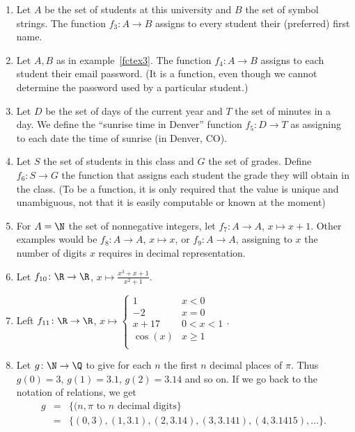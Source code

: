 \begin{enumerate}
\item Let $A$ be the set of students at this university and $B$ the set of
symbol strings. The function $f_3\colon A\to B$ assigns to every student their
(preferred) first name. \label{fctex3}
\item Let $A,B$ as in example~\ref{fctex3}.
The function $f_4\colon A\to B$ assigns to each student
their email password. (It is a function, even though we cannot determine the
password used by a particular student.)
\item Let $D$ be the set of days of the current year and $T$ the set of
minutes in a day. We define the ``sunrise time in Denver'' function $f_5\colon
D\to T$ as assigning to each date the time of sunrise (in Denver, CO).
\item Let $S$ the set of students in this class and $G$ the set of grades.
Define $f_6\colon S\to G$ the function that assigns each student the
grade they will obtain in the class.
(To be a function, it is only required that the value is unique and
unambiguous, not that it is easily computable or known at the moment)
\item For $A=\N$ the set of nonnegative integers,
let $f_7\colon A\to A$, $x\mapsto x+1$. Other examples would be
$f_8\colon A\to A$, $x\mapsto x$, or
$f_9\colon A\to A$, assigning to $x$ the number of digits $x$ requires in
decimal representation.
\item Let $f_{10}\colon \R\to\R$, $x\mapsto\frac{x^3+x+1}{x^2+1}$.
\item Left $f_{11}\colon\R\to\R$, $x\mapsto\begin{cases}
1&x<0\\
-2&x=0\\
x+17&0<x<1\\
\cos(x)&x\ge 1\\
\end{cases}$.
\item Let $g\colon\N\to\Q$ to give for each $n$ the first $n$ decimal
places of $\pi$. Thus $g(0)=3$, $g(1)=3.1$, $g(2)=3.14$ and so on. If we go
back to the notation of relations, we get
\begin{eqnarray*}
g&=&\{(n,\mbox{$\pi$ to $n$ decimal digits}\}\\
&=&\{(0,3),(1,3.1),(2,3.14),(3,3.141),(4,3.1415),\ldots\}.
\end{eqnarray*}
\end{enumerate}


